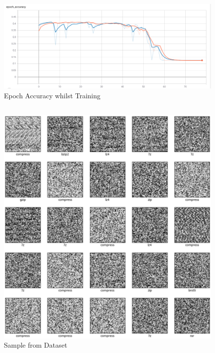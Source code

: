 \documentclass[conference]{IEEEtran}
\begin{document}
\subsection{}
\begin{figure}[H]
    \centering
    \includegraphics[scale=0.2]{./epoch.png}
    \caption{Epoch Accuracy whilst Training}
    \label{fig:epoch-accuracy}
\end{figure}

\subsection{}
\begin{figure}[H]
    \centering
    \includegraphics[scale=0.2]{./samples.png}
    \caption{Sample from Dataset}
    \label{fig:samples}
\end{figure}
\end{document}
